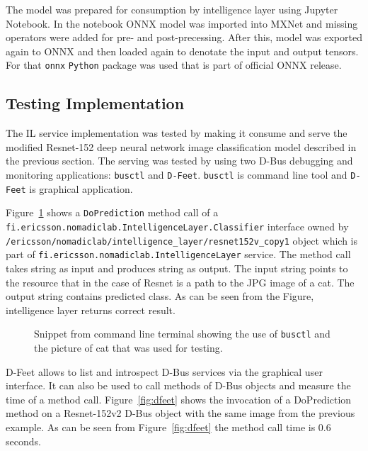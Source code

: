 \documentclass[english, 12pt, a4paper, elec, utf8, online]{aaltothesis}
\begin{document}
The model was prepared for consumption by intelligence layer using Jupyter Notebook. In the notebook ONNX model was imported into MXNet and missing operators were added for pre- and post-precessing. After this, model was exported again to ONNX and then loaded again to denotate the input and output tensors. For that \texttt{onnx} \texttt{Python} package was used that is part of official ONNX release.   

\subsection{Testing Implementation} 
The IL service implementation was tested by making it consume and serve the modified Resnet-152 deep neural network image classification model described in the previous section. The serving was tested by using two D-Bus debugging and monitoring applications: \texttt{busctl} and \texttt{D-Feet}. \texttt{busctl} is command line tool and \texttt{D-Feet} is graphical application.

Figure~\ref{fig:busctl} shows a \texttt{DoPrediction} method call of a\\ \texttt{fi.ericsson.nomadiclab.IntelligenceLayer.Classifier} interface owned by \\ \texttt{/ericsson/nomadiclab/intelligence\_layer/resnet152v\_copy1} object which is part of \texttt{fi.ericsson.nomadiclab.IntelligenceLayer} service.  The method call takes string as input and produces string as output. The input string points to the resource that in the case of Resnet is a path to the JPG image of a cat. The output string contains predicted class. As can be seen from the Figure, intelligence layer returns correct result. 

\begin{figure}[h!]
\centering
{}
\caption{Snippet from command line terminal showing the use of \texttt{busctl} and the picture of cat that was used for testing.}\label{fig:busctl}
\end{figure}

D-Feet allows to list and introspect D-Bus services via the graphical user interface. It can also be used to call methods of D-Bus objects and measure the time of a method call. Figure~\ref{fig:dfeet} shows the invocation of a DoPrediction method on a Resnet-152v2 D-Bus object with the same image from the previous example. As can be seen from Figure~\ref{fig:dfeet} the method call time is $0.6$ seconds.    
\end{document}
